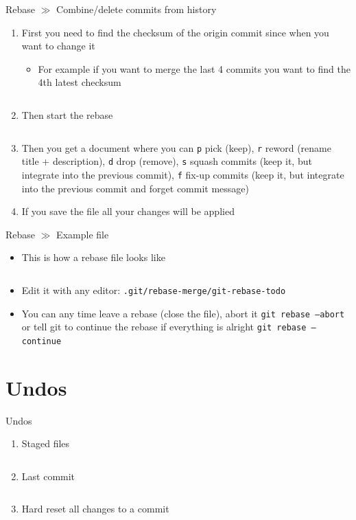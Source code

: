 \documentclass[10pt]{beamer}
\begin{document}
\begin{frame}{Rebase $\gg$ Combine/delete commits from history}
	\begin{enumerate}
		\item First you need to find the checksum of the origin commit since when you want to change it
		\begin{itemize}
			\item For example if you want to merge the last 4 commits you want to find the 4th latest checksum
		\end{itemize}
		\inputminted[bgcolor=lightGreyCustom,fontsize=\scriptsize]{sh}{./resources/git_rebase_01_checksums.sh}
		\item Then start the rebase
		\inputminted[bgcolor=lightGreyCustom,fontsize=\scriptsize]{sh}{./resources/git_rebase_02_rebase.sh}
		\item Then you get a document where you can \texttt{p} pick (keep), \texttt{r} reword (rename title + description), \texttt{d} drop (remove), \texttt{s} squash commits (keep it, but integrate into the previous commit), \texttt{f} fix-up commits (keep it, but integrate into the previous commit and forget commit message)
		\item If you save the file all your changes will be applied
	\end{enumerate}
\end{frame}

\begin{frame}{Rebase $\gg$ Example file}
	\begin{itemize}
		\item This is how a rebase file looks like
		\inputminted[bgcolor=lightGreyCustom,fontsize=\scriptsize]{sh}{./resources/git_rebase_03_example}
		\item Edit it with any editor: \texttt{.git/rebase-merge/git-rebase-todo}
		\item You can any time leave a rebase (close the file), abort it \texttt{git rebase --abort} or tell git to continue the rebase if everything is alright \texttt{git rebase --continue}
	\end{itemize}
\end{frame}

\section{Undos}

\begin{frame}{Undos}
	\begin{enumerate}
		\item Staged files
		\inputminted[bgcolor=lightGreyCustom,fontsize=\scriptsize]{sh}{./resources/git_undos_01_stage_files.sh}
		\item Last commit
		\inputminted[bgcolor=lightGreyCustom,fontsize=\scriptsize]{sh}{./resources/git_undos_02_last_commit.sh}
		\item  Hard reset all changes to a commit
		\inputminted[bgcolor=lightGreyCustom,fontsize=\scriptsize]{sh}{./resources/git_undos_03_hard_reset.sh}
	\end{enumerate}
\end{frame}
\end{document}
